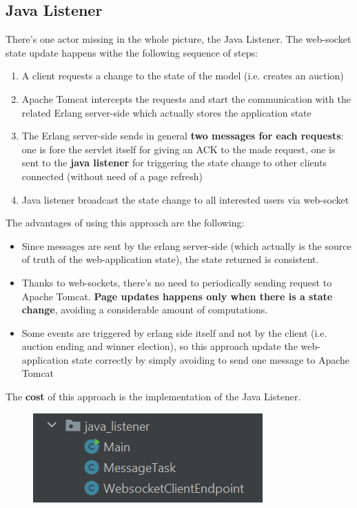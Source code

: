 \subsection{Java Listener}
There's one actor missing in the whole picture, the Java Listener.
The web-socket state update happens withe the following sequence of steps:
\begin{enumerate}
	\item A client requests a change to the state of the model (i.e. creates an auction)
	\item Apache Tomcat intercepts the requests and start the communication with the related Erlang server-side which actually stores the application state
	\item The Erlang server-side sends in general \textbf{two messages for each requests}: one is fore the servlet itself for giving an ACK to the made request, one is sent to the \textbf{java listener} for triggering the state change to other clients connected (without need of a page refresh)
	\item Java listener broadcast the state change to all interested users via web-socket
\end{enumerate}  
The advantages of using this approach are the following:
\begin{itemize}
	\item Since messages are sent by the erlang server-side (which actually is the source of truth of the web-application state), the state returned is consistent.
	\item Thanks to web-sockets, there's no need to periodically sending request to Apache Tomcat. \textbf{Page updates happens only when there is a state change}, avoiding a considerable amount of computations. 
	\item Some events are triggered by erlang side itself and not by the client (i.e. auction ending and winner election), so this approach update the web-application state correctly by simply avoiding to send one message to Apache Tomcat
\end{itemize}
The \textbf{cost} of this approach is the implementation of the Java Listener.
\begin{figure}[H]
	\centering
	\includegraphics[width=0.4\linewidth]{img/java_listener}
	\caption{}
	\label{fig:javalistener}
\end{figure}

